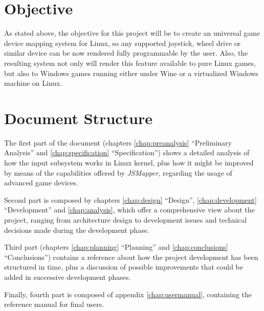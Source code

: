 \section{Objective}
As stated above, the objective for this project will be to create an universal game device mapping system for Linux, so any supported  joystick, wheel drive or similar device can be now rendered fully programmable by the user. Also, the resulting system not only will render this feature available to pure Linux games, but also to Windows games running either under Wine or a virtualized Windows machine on Linux.

\section{Document Structure}
The first part of the document (chapters \ref{chap:preanalysis} ``Preliminary Analysis'' and \ref{chap:specification} ``Specification'') shows a detailed analysis of how the input subsystem works in Linux kernel, plus how it might be improved by means of the capabilities offered by \emph{JSMapper}, regarding the usage of advanced game devices.

Second part is composed by chapters \ref{chap:design} ``Design'', \ref{chap:development} ``Development'' and \ref{chap:analysis}, which offer a comprehensive view about the project, ranging from architecture design to development issues and technical decisions made during the development phase.

Third part (chapters \ref{chap:planning} ``Planning'' and \ref{chap:conclusions} ``Conclusions'') contains a reference about how the project development has been structured in time, plus a discussion of possible improvements that could be added in successive development phases.

Finally, fourth part is composed of appendix \ref{chap:usermanual}, containing the reference manual for final users.
